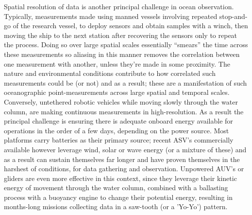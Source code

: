 Spatial resolution of data is another principal challenge in ocean
observation. Typically, measurements made using manned vessels involving
repeated stop-and-go of the research vessel, to deploy sensors and
obtain samples with a winch, then moving the ship to the next station
after recovering the sensors only to repeat the process. Doing so over
large spatial scales essentially ``smears'' the time across these
measurements so aliasing \cite{} in this manner removes the correlation
between one measurement with another, unless they're made in some
proximity. The nature and environmental conditions contribute to how
correlated such measurements could be (or not) and as a result; these
are a manifestation of such oceanographic point-measurements across
large spatial and temporal scales. Conversely, untethered robotic
vehicles while moving slowly through the water column, are making
continuous measurements in high-resolution. As a result the principal
challenge is ensuring there is adequate onboard energy available for
operations in the order of a few days, depending on the power
source. Most platforms carry batteries as their primary source; recent
ASV's commercially available however leverage wind, solar or wave energy
(or a mixture of these) and as a result can sustain themselves far
longer and have proven themselves in the harshest of conditions, for
data gathering and observation. Unpowered AUV's or gliders are even more
effective in this context, since they leverage their kinetic energy of
movement through the water column, combined with a ballasting process
with a buoyancy engine to change their potential energy, resulting in
months-long missions collecting data in a saw-tooth (or a 'Yo-Yo')
pattern.
